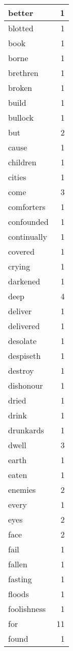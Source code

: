 \begin{center}
\begin{longtable}{l|r}
better & 1\\ \hline 
blotted & 1\\ \hline 
book & 1\\ \hline 
borne & 1\\ \hline 
brethren & 1\\ \hline 
broken & 1\\ \hline 
build & 1\\ \hline 
bullock & 1\\ \hline 
but & 2\\ \hline 
cause & 1\\ \hline 
children & 1\\ \hline 
cities & 1\\ \hline 
come & 3\\ \hline 
comforters & 1\\ \hline 
confounded & 1\\ \hline 
continually & 1\\ \hline 
covered & 1\\ \hline 
crying & 1\\ \hline 
darkened & 1\\ \hline 
deep & 4\\ \hline 
deliver & 1\\ \hline 
delivered & 1\\ \hline 
desolate & 1\\ \hline 
despiseth & 1\\ \hline 
destroy & 1\\ \hline 
dishonour & 1\\ \hline 
dried & 1\\ \hline 
drink & 1\\ \hline 
drunkards & 1\\ \hline 
dwell & 3\\ \hline 
earth & 1\\ \hline 
eaten & 1\\ \hline 
enemies & 2\\ \hline 
every & 1\\ \hline 
eyes & 2\\ \hline 
face & 2\\ \hline 
fail & 1\\ \hline 
fallen & 1\\ \hline 
fasting & 1\\ \hline 
floods & 1\\ \hline 
foolishness & 1\\ \hline 
for & 11\\ \hline 
found & 1\\ \hline 

\end{longtable}
\end{center}
